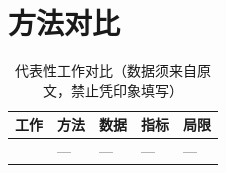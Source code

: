 \section{方法对比}
\label{sec:comparison}

\begin{table}[htbp]
  \centering
  \caption{代表性工作对比（数据须来自原文，禁止凭印象填写）}
  \label{tab:comparison}
  \begin{tabular}{lllll}
    \toprule
    工作 & 方法 & 数据 & 指标 & 局限 \\
    \midrule
    \textcite{example2026} & --- & --- & --- & --- \\
    \bottomrule
  \end{tabular}
\end{table}

